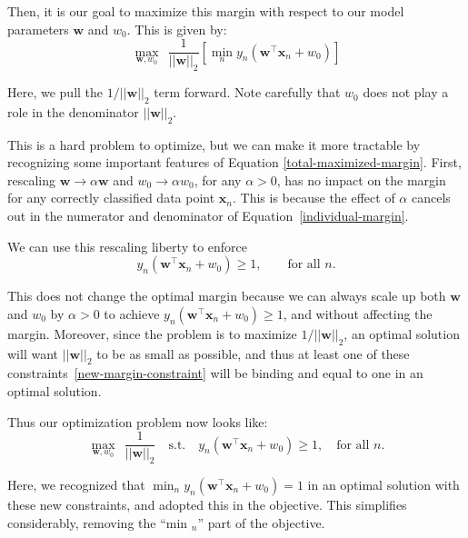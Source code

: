 Then, it is our goal to maximize this margin with respect to our model parameters $\textbf{w}$ and $w_{0}$. This is given by:
\begin{equation} \label{total-maximized-margin}
  \underset{\textbf{w}, w_{0}}{\max}  \ \ \frac{1}{||\textbf{w}||_2} \left[\min_{n} y_{n}(\textbf{w}^\top\textbf{x}_{n} + w_{0}) \right]
\end{equation}

Here, we pull the $1/||\mathbf{w}||_2$ term forward. Note carefully that $w_0$ does not play a role in the denominator $||\mathbf{w}||_2$.

This is a hard problem to optimize, but we can make it more tractable by recognizing some important features of Equation \ref{total-maximized-margin}. First, rescaling $\textbf{w} \rightarrow \alpha \textbf{w}$ and $w_{0} \rightarrow \alpha w_{0}$, for any $\alpha >0$, has no impact on the margin for any correctly classified data point $\textbf{x}_{n}$. This is because the effect of $\alpha$ cancels out in the numerator and denominator of Equation~\ref{individual-margin}.

We can use this rescaling liberty to enforce
%
\begin{equation} \label{new-margin-constraint}
  y_{n}(\textbf{w}^\top\textbf{x}_{n} + w_{0}) \geq 1,  \quad \quad \mbox{for all $n$}.
\end{equation}

This does not change the optimal margin because we can always scale up both $\mathbf{w}$ and $w_0$ by $\alpha>0$ to achieve
$ y_{n}(\textbf{w}^\top\textbf{x}_{n} + w_{0}) \geq 1$, and without affecting the margin. Moreover, since the problem is to maximize $1/||\mathbf{w}||_2$, an optimal solution will want $||\mathbf{w}||_2$ to be as small as possible, and thus at
least one of these constraints~\eqref{new-margin-constraint} will be binding and equal to one  in an optimal solution. 

Thus our optimization problem now looks like:
\begin{equation} \label{simplified-maximized-margin-optimization}
	\underset{\textbf{w}, w_{0}}{\max} \ \ \frac{1}{||\textbf{w}||_2} \quad \text{s.t.} \quad y_{n}(\textbf{w}^\top\textbf{x}_{n} + w_{0}) \geq 1, \quad \mbox{for all $n$}.
      \end{equation}

      Here, we recognized that $\min_{n} y_{n}(\textbf{w}^\top\textbf{x}_{n} + w_{0})=1$ in an optimal solution with these new constraints,
      and adopted this in the objective.  This simplifies considerably, removing the ``min $_n$'' part of the objective.
      
